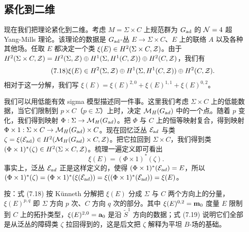 
\subsection{紧化到二维} \label{sec:comptwop}

现在我们把理论紧化到二维。考虑 $M=\Sigma\times C$ 上规范群为 $G_{\rm{ad}}$ 的 ${\EUN}=4$ 超 Yang-Mills 理论。该理论的数据是 $G_{\rm{ad}}$-丛 $E\to\Sigma\times C$、$E$ 上的联络 $A$ 以及各种其他场。任取 $E$ 都决定一个类 $\xi(E)\in H^2(\Sigma\times C,\CZ)$。由于 $H^2(\Sigma\times C,\CZ)=H^2(\Sigma,\CZ)\oplus H^1(\Sigma,H^1(C,\CZ))\oplus H^2(C,\CZ)$，我们有 %
\begin{equation*}
\tag*{(7.18)}
\xi(E)\in H^2(\Sigma,\CZ)\oplus
H^1(\Sigma,H^1(C,\CZ))\oplus
H^2(C,\CZ).
\end{equation*}
相对于这一分解，我们写 $\xi(E)=\xi(E)^{2,0}+\xi(E)^{1,1}+\xi(E)^{0,2}$。

我们可以用低能有效 sigma 模型描述同一件事。这里我们考虑 $\Sigma\times C$ 上的低能数据，当它们限制到 $p\times C$（$p\in \Sigma$）上时，决定 $\MHAD$ 中的一个点。随着 $p$ 变化，我们得到映射 $\Phi:\Sigma\to \MHAD$。把 $\Phi$ 与 $C$ 上的恒等映射复合，得到映射 $\Phi\times 1:\Sigma\times C\to \MHAD\times C$。现在回忆泛丛 ${\EUE}_{\rm ad}$ 与类 $\zeta=\xi({\EUE}_{\rm {ad}})\in H^2( \MHAD\times C,\CZ)$。把它拉回到 $\Sigma\times C$，我们得到类 $(\Phi\times 1)^*(\zeta)\in H^2(\Sigma\times C,\CZ)$。梳理一遍定义即可看出 %
\setcounter{equation}{18}
\begin{equation}\label{eq:yrog}
\xi(E)=(\Phi\times
1)^*(\zeta).
\end{equation}
事实上，泛丛 ${\EUE}_{ad}$ 正是这样定义的，使得 $(\Phi\times 1)^*({\EUE}_{{\rm ad}})=E$，所以 $(\Phi\times 1)^*(\zeta)=(\Phi\times 1)^*(\xi(\EUE_{{\rm ad}}))=\xi((\Phi\times 1)^*(\EUE_{{\rm ad}}))=\xi(E)$。

\begin{yizhu}[物理图像]
按：式 (7.18) 按 Künneth 分解把 $\xi(E)$ 分成 $\Sigma$ 与 $C$ 两个方向上的分量，$\xi(E)^{p,q}$ 即 $\Sigma$ 方向 $p$ 次、$C$ 方向 $q$ 次的部分。其中 $\xi(E)^{0,2}={\bf m}_0$ 度量 $E$ 限制到 $C$ 上的拓扑类型，$\xi(E)^{2,0}={\bf a}_0$ 是沿 $\tilde S^1$ 方向的数据；式 (7.19) 说明它们全部是从泛丛的障碍类 $\zeta$ 拉回得到的，这是后文把 $\zeta$ 解释为平坦 $B$-场的基础。
\end{yizhu}

